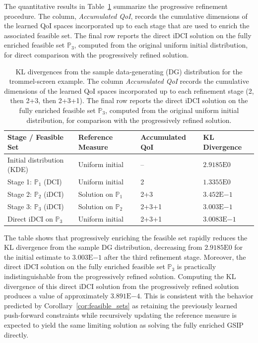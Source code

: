 \documentclass{article}
\newcounter{example}[section]
\newcommand{\p}{\mathbb{P}}
\newcommand{\expnumber}[2]{{#1}\mathrm{E}{#2}}
\begin{document}
The quantitative results in Table~\ref{tab:trommel_kl} summarize the progressive refinement procedure.
The column, \emph{Accumulated QoI}, records the cumulative dimensions of the learned QoI spaces incorporated up to each stage that are used to enrich the associated feasible set.
The final row reports the direct iDCI solution on the fully enriched feasible set $\p_3$, computed from the original uniform initial distribution, for direct comparison with the progressively refined solution.

\begin{table}[ht]
\centering
\caption{KL divergences from the sample data-generating (DG) distribution for the trommel-screen example.
The column \emph{Accumulated QoI} records the cumulative dimensions of the learned QoI spaces incorporated up to each refinement stage (2, then 2+3, then 2+3+1).
The final row reports the direct iDCI solution on the fully enriched feasible set $\p_3$, computed from the original uniform initial distribution, for comparison with the progressively refined solution.}
\label{tab:trommel_kl}
\small
\begin{tabular}{p{4.4cm}p{3.5cm}p{3cm}p{2.6cm}}
\toprule
\textbf{Stage / Feasible Set} & \textbf{Reference Measure} & \textbf{Accumulated QoI} & \textbf{KL Divergence} \\
\midrule
Initial distribution (KDE) & Uniform initial & -- & $\expnumber{2.9185}{0}$ \\
Stage 1: $\p_1$ (DCI) & Uniform initial & 2 & $\expnumber{1.3355}{0}$ \\
Stage 2: $\p_2$ (iDCI) & Solution on $\p_1$ & 2+3 & $\expnumber{3.452}{-1}$ \\
Stage 3: $\p_3$ (iDCI) & Solution on $\p_2$ & 2+3+1 & $\expnumber{3.003}{-1}$ \\
Direct iDCI on $\p_3$ & Uniform initial & 2+3+1 & $\expnumber{3.0083}{-1}$ \\
\bottomrule
\end{tabular}
\end{table}

The table shows that progressively enriching the feasible set rapidly reduces the KL divergence from the sample DG distribution, decreasing from $\expnumber{2.9185}{0}$ for the initial estimate to $\expnumber{3.003}{-1}$ after the third refinement stage.
Moreover, the direct iDCI solution on the fully enriched feasible set $\p_3$ is practically indistinguishable from the progressively refined solution.
Computing the KL divergence of this direct iDCI solution from the progressively refined solution produces a value of approximately $\expnumber{3.891}{-4}$.
This is consistent with the behavior predicted by Corollary~\ref{cor:feasible_sets} as retaining the previously learned push-forward constraints while recursively updating the reference measure is expected to yield the same limiting solution as solving the fully enriched GSIP directly.
\end{document}
